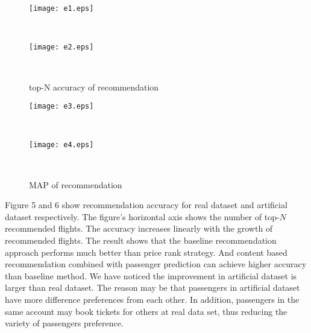 \documentclass{sig-alternate-05-2015}
\begin{document}
\begin{figure}[!h]
              \begin{minipage}[t]{0.47\linewidth}
              \centering
              \texttt{[image: e1.eps]}\\
              \label{Price_Distribution}
              \end{minipage}
              \begin{minipage}[t]{0.005\linewidth}~~~
              \end{minipage}
              \begin{minipage}[t]{0.47\linewidth}
              \centering
              \texttt{[image: e2.eps]}\\
              \label{Departure_Time_Distribution}
              \end{minipage}
              \begin{minipage}[t]{0.005\linewidth}~~~
              \end{minipage}
              \caption{top-N accuracy of recommendation}
          \label{total_rank}
          \vspace{-0.4cm}
\end{figure}
\begin{figure}[!h]
              \begin{minipage}[t]{0.47\linewidth}
              \centering
              \texttt{[image: e3.eps]}\\
              \label{Price_Distribution}
              \end{minipage}
              \begin{minipage}[t]{0.005\linewidth}~~~
              \end{minipage}
              \begin{minipage}[t]{0.47\linewidth}
              \centering
              \texttt{[image: e4.eps]}\\
              \label{Departure_Time_Distribution}
              \end{minipage}
              \begin{minipage}[t]{0.005\linewidth}~~~
              \end{minipage}
              \caption{MAP of recommendation}
          \label{total_rank}
          \vspace{-0.4cm}
\end{figure}\par
Figure 5 and 6 show recommendation accuracy for real dataset and artificial dataset respectively. The figure's horizontal axis shows the number of top-$N$ recommended flights. The accuracy increases linearly with the growth of recommended flights. The result shows that the baseline recommendation approach performs much better than price rank strategy. And content based recommendation combined with passenger prediction can achieve higher accuracy than baseline method. We have noticed the improvement in artificial dataset is larger than real dataset. The reason may be that passengers in artificial dataset have more difference preferences from each other. In addition, passengers in the same account may book tickets for others at real data set, thus reducing the variety of passengers preference.
\end{document}
